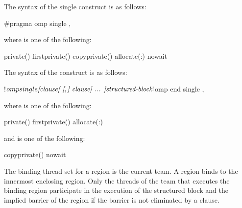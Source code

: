 \vspace{-1ex}  %
\syntax
\begin{ccppspecific}
The syntax of the single construct is as follows:

\begin{ompcPragma}
#pragma omp single \plc{[clause[ [},\plc{] clause] ... ] new-line}
\end{ompcPragma}

\begin{samepage}
where  is one of the following:

\begin{indentedcodelist}
private()
firstprivate()
copyprivate()
allocate(\plc{[allocator }:\plc{] list})
nowait
\end{indentedcodelist}
\end{samepage}
\end{ccppspecific}

\begin{fortranspecific}
The syntax of the  construct is as follows:

\begin{ompfPragma}
!$omp single \plc{[clause[ [},\plc{] clause] ... ]}
   \plc{structured-block}
!$omp end single \plc{[end_clause[ [},\plc{] end_clause] ... ]}
\end{ompfPragma}

where  is one of the following:

\begin{indentedcodelist}
private()
firstprivate()
allocate(\plc{[allocator }:\plc{] list})
\end{indentedcodelist}

and  is one of the following:

\begin{indentedcodelist}
copyprivate()
nowait
\end{indentedcodelist}
\end{fortranspecific}

\binding
The binding thread set for a  region is the current team. 
A  region binds to the innermost enclosing  
region. Only the threads of the team that executes the binding  
region participate in the execution of the structured block and the implied 
barrier of the  region if the barrier is not eliminated by a
 clause.

